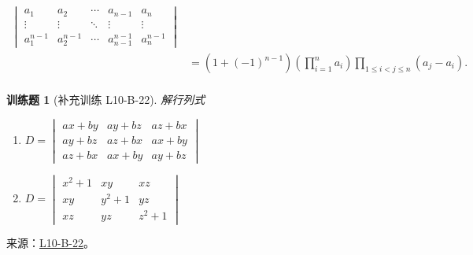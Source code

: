 \documentclass[UTF8,12pt,a4paper,fontset=fandol]{ctexart}
\newtheorem{exercise}{训练题}[section]
\begin{document}
\begin{solve}
\begin{align*}
\begin{vmatrix}
                    a_{1}       & a_{2}       & \cdots & a_{n-1}       & a_{n}       \\
                    \vdots      & \vdots      & \ddots & \vdots        & \vdots      \\
                    a_{1}^{n-1} & a_{2}^{n-1} & \cdots & a_{n-1}^{n-1} & a_{n}^{n-1}
                \end{vmatrix}                                     \\
                            & =(1+(-1)^{n-1})\left(\prod_{i=1}^na_i\right)\prod_{1\leqslant i<j\leqslant n}(a_j-a_i). \\
            \end{align*}
\end{solve}

\begin{exercise}[补充训练 L10-B-22]\label{prob:L10-B-22}
解行列式
         \begin{enumerate}
                \item $D=\begin{vmatrix}
                              ax+by & ay+bz & az+bx \\
                              ay+bz & az+bx & ax+by \\
                              az+bx & ax+by & ay+bz
                          \end{vmatrix}$

                \item $D=\begin{vmatrix}
                              x^2+1 & xy    & xz    \\
                              xy    & y^2+1 & yz    \\
                              xz    & yz    & z^2+1
                          \end{vmatrix}$
            \end{enumerate}
\end{exercise}
\noindent 来源：\href{https://github.com/yhwu-is/Linear-Algebra-Left-Undone/blob/new/%E8%AE%B2%E4%B9%89/%E4%B8%93%E9%A2%98/10%20%E8%A1%8C%E5%88%97%E5%BC%8F.tex}{L10-B-22}。
\end{document}
